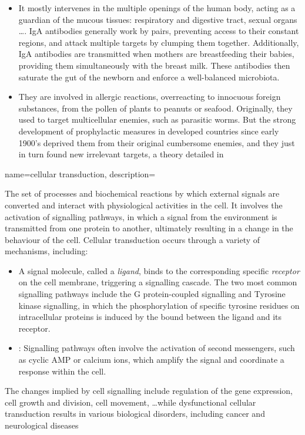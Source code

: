 {{\begin{itemize}
    \item[IgA antibodies] It mostly intervenes in the multiple openings of the human body, acting as a guardian of the mucous tissues: respiratory and digestive tract, sexual organs \ldots. IgA antibodies generally work by pairs, preventing access to their constant regions, and attack multiple targets by clumping them together.    
    Additionally, IgA antibodies are transmitted when mothers are breastfeeding their babies, providing them simultaneously with the breast milk. These antibodies then saturate the gut of the newborn and enforce a well-balanced microbiota.
    \item[IgE antibodies] They are involved in allergic reactions, overreacting to innocuous foreign substances, from the pollen of plants to peanuts or seafood. Originally, they used to target multicellular enemies, such as parasitic worms. But the strong development of prophylactic measures in developed countries since early 1900's deprived them from their original cumbersome enemies, and they just in turn found new irrelevant targets, a theory detailed in \autocite[Chapter 39]{dettmer21} 
\end{itemize}}}



{name=cellular transduction, 
description={The set of processes and biochemical reactions by which  external signals are converted and interact with physiological activities in the cell. It involves the activation of signalling pathways, in which a signal from the environment is transmitted from one protein to another, ultimately resulting in a change in the behaviour of the cell. Cellular transduction occurs through a variety of mechanisms, including:
\begin{itemize}
    \item[Receptor-ligand interaction:] A signal molecule, called a \textit{ligand}, binds to the corresponding specific \textit{receptor} on the cell membrane, triggering a signalling cascade. The two most common signalling pathways include the G protein-coupled signalling and Tyrosine kinase signalling, in which the phosphorylation of specific tyrosine residues on intracellular proteins is induced by the bound between the ligand and its receptor.
    \item[Second messengers]: Signalling pathways often involve the activation of second messengers, such as cyclic AMP or calcium ions, which amplify the signal and coordinate a response within the cell.
\end{itemize}
The changes implied by cell signalling include regulation of the gene expression, cell growth and division, cell movement, \ldots while dysfunctional cellular transduction results in various biological disorders, including cancer and neurological diseases}}

